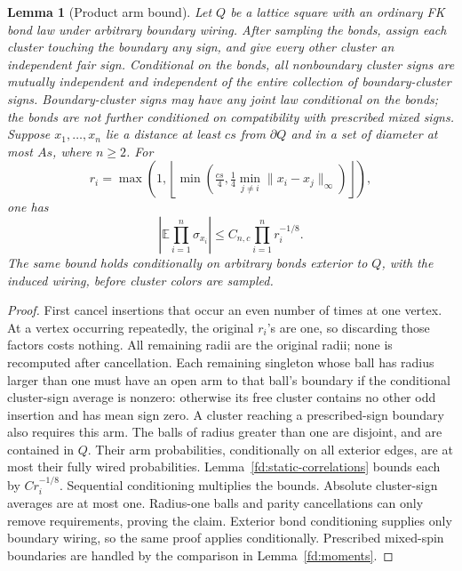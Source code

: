 \documentclass[11pt]{article}
\newtheorem{lemma}[theorem]{Lemma}
\theoremstyle{definition}
\theoremstyle{remark}
\numberwithin{equation}{section}
\begin{document}
\begin{lemma}[Product arm bound]\label{fd:fk-product}
Let \(Q\) be a lattice square with an ordinary FK bond law under
arbitrary boundary wiring.  After sampling the bonds, assign each
cluster touching the boundary any sign, and give every other cluster
an independent fair sign.  Conditional on the bonds, all nonboundary
cluster signs are mutually independent and independent of the entire
collection of boundary-cluster signs.  Boundary-cluster signs may have
any joint law conditional on the bonds; the bonds are not further conditioned on compatibility
with prescribed mixed signs.  Suppose
\(x_1,\ldots,x_n\) lie a distance at least \(cs\) from \(\partial Q\)
and in a set of diameter at most \(As\), where \(n\ge2\).
For
\[
 r_i=\max\left(1,\left\lfloor
       \min\left(\tfrac{cs}{4},
             \tfrac14\min_{j\ne i}\|x_i-x_j\|_\infty\right)
                         \right\rfloor\right),
\]
one has
\[
 \left|\mathbb E\prod_{i=1}^n\sigma_{x_i}\right|
 \le C_{n,c}\prod_{i=1}^n r_i^{-1/8}.
\]
The same bound holds conditionally on arbitrary bonds exterior to \(Q\),
with the induced wiring, before cluster colors are sampled.
\end{lemma}

\begin{proof}
First cancel insertions that occur an even number of times at one vertex.
At a vertex occurring repeatedly, the original \(r_i\)'s are one, so
discarding those factors costs nothing.  All remaining radii are the
original radii; none is recomputed after cancellation.  Each remaining singleton whose
ball has radius larger than one must have an open arm to that ball's
boundary if the conditional cluster-sign average is nonzero: otherwise
its free cluster contains no other odd insertion and has mean sign zero.
A cluster reaching a prescribed-sign boundary also requires this arm.
The balls of radius greater than one are disjoint, and are contained in
\(Q\).  Their arm probabilities, conditionally on all exterior edges,
are at most their fully wired probabilities.  Lemma~\ref{fd:static-correlations}
bounds each by \(Cr_i^{-1/8}\).  Sequential conditioning multiplies
the bounds.  Absolute cluster-sign averages are at most one.  Radius-one
balls and parity cancellations can only remove requirements, proving the
claim.  Exterior bond conditioning supplies only boundary wiring,
so the same proof applies conditionally.  Prescribed mixed-spin
boundaries are handled by the comparison in Lemma~\ref{fd:moments}.
\end{proof}
\end{document}
